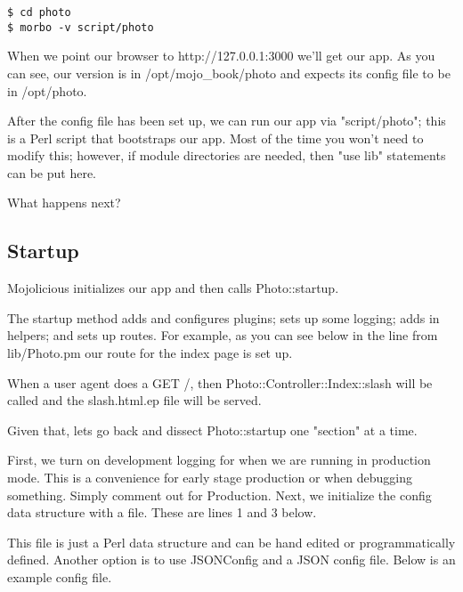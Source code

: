 \documentclass[14pt]{extreport}
\begin{document}
\begin{lstlisting}[style=BashInputStyle]
$ cd photo
$ morbo -v script/photo
\end{lstlisting}

When we point our browser to http://127.0.0.1:3000 we'll get our app.  As you
can see, our version is in /opt/mojo\_book/photo and expects its config file to
be in /opt/photo.

After the config file has been set up, we can run our app via "script/photo";
this is a Perl script that bootstraps our app.  Most of the time you won't need
to modify this; however, if module directories are needed, then "use lib" statements
can be put here.

What happens next?

\subsection{Startup}

Mojolicious initializes our app and then calls Photo::startup.

The startup method adds and configures plugins; sets up some logging; adds in
helpers; and sets up routes.  For example, as you can see below in the line
from lib/Photo.pm our route for the index page is set up.



When a user agent does a GET /, then Photo::Controller::Index::slash will be
called and the slash.html.ep file will be served.

Given that, lets go back and dissect Photo::startup one "section" at a time.

First, we turn on development logging for when we are running in production
mode.  This is a convenience for early stage production or when debugging
something.  Simply comment out for Production.  Next, we initialize the
config data structure with a file.  These are lines 1 and 3 below.



This file is just a Perl data structure and can be hand edited or
programmatically defined.  Another option is to use JSONConfig and a JSON
config file.  Below is an example config file.


\end{document}
